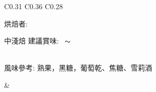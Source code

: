 \documentclass[10pt,a4paper]{article}
\begin{document}
\begin{tabular}{C{0.31\textwidth} C{0.36\textwidth} C{0.28\textwidth}}
{{烘焙者: \textbf{\scriptsize{}}}\vspace*{-0.3em}\\
 \addtocounter{datenumber}{
5 }%
\setdatebynumber{\thedatenumber} 
{\normalsize 
中淺焙%
\enskip \scriptsize 建議賞味:} \scriptsize{\datemonthname ~\thedateday}$\thicksim$\addtocounter{datenumber}{55}\setdatebynumber{\thedatenumber} \datedate
\\\scriptsize 風味參考: 熟果，黑糖，葡萄乾、焦糖、雪莉酒
}& \shortstack[c]{
%
%
}
\end{tabular}
\end{document}
